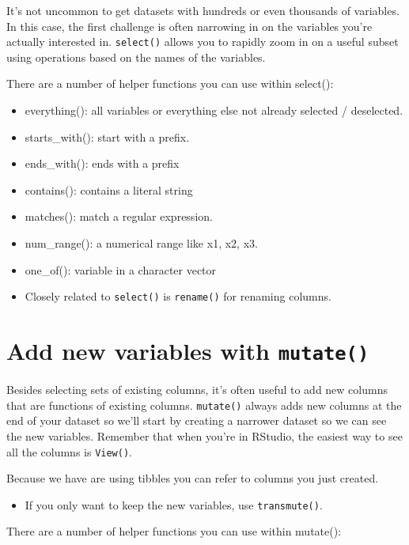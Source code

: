 \documentclass[]{book}
\providecommand{\tightlist}{%
  \setlength{\itemsep}{0pt}\setlength{\parskip}{0pt}}
\newenvironment{rmdblock}[1]
  {\begin{shaded*}
  \begin{itemize}
  \renewcommand{\labelitemi}{
    \raisebox{-.7\height}[0pt][0pt]{
      {\setkeys{Gin}{width=3em,keepaspectratio}\texttt{[image: images/\#1]}}
    }
  }
  \item
  }
  {
  \end{itemize}
  \end{shaded*}
  }
\newenvironment{rmdnote}
  {\begin{rmdblock}{note}}
  {\end{rmdblock}}
\newenvironment{rmdtip}
  {\begin{rmdblock}{tip}}
  {\end{rmdblock}}
\theoremstyle{definition}
\theoremstyle{definition}
\theoremstyle{definition}
\theoremstyle{remark}
\begin{document}
It's not uncommon to get datasets with hundreds or even thousands of
variables. In this case, the first challenge is often narrowing in on
the variables you're actually interested in. \texttt{select()} allows
you to rapidly zoom in on a useful subset using operations based on the
names of the variables.

There are a number of helper functions you can use within select():

\begin{itemize}
\tightlist
\item
  everything(): all variables or everything else not already selected /
  deselected.
\item
  starts\_with(): start with a prefix.
\item
  ends\_with(): ends with a prefix
\item
  contains(): contains a literal string
\item
  matches(): match a regular expression.
\item
  num\_range(): a numerical range like x1, x2, x3.
\item
  one\_of(): variable in a character vector
\end{itemize}

\begin{rmdnote}
Closely related to \texttt{select()} is \texttt{rename()} for renaming
columns.
\end{rmdnote}

\section{\texorpdfstring{Add new variables with
\texttt{mutate()}}{Add new variables with mutate()}}\label{add-new-variables-with-mutate}

Besides selecting sets of existing columns, it's often useful to add new
columns that are functions of existing columns. \texttt{mutate()} always
adds new columns at the end of your dataset so we'll start by creating a
narrower dataset so we can see the new variables. Remember that when
you're in RStudio, the easiest way to see all the columns is
\texttt{View()}.

Because we have are using tibbles you can refer to columns you just
created.

\begin{rmdtip}
If you only want to keep the new variables, use \texttt{transmute()}.
\end{rmdtip}

There are a number of helper functions you can use within mutate():
\end{document}
